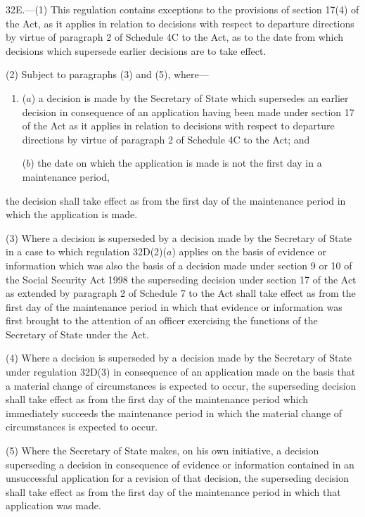 \documentclass[12pt,a4paper]{article}
\begin{document}
32E.—(1) This regulation contains exceptions to the provisions of section 17(4) of the Act, as it applies in relation to decisions with respect to departure directions by virtue of paragraph 2 of Schedule 4C to the Act, as to the date from which decisions which supersede earlier decisions are to take effect.

(2) Subject to paragraphs (3) and (5), where---
\begin{enumerate}\item[]
($a$) a decision is made by the Secretary of State which supersedes an earlier decision in consequence of an application having been made under section 17 of the Act as it applies in relation to decisions with respect to departure directions by virtue of paragraph 2 of Schedule 4C to the Act; and

($b$) the date on which the application is made is not the first day in a maintenance period, 
\end{enumerate}
the decision shall take effect as from the first day of the maintenance period in which the application is made.

(3) Where a decision is superseded by a decision made by the Secretary of State in a case to which regulation 32D(2)($a$) applies on the basis of evidence or information which was also the basis of a decision made under section 9 or 10 of the Social Security Act 1998 the superseding decision under section 17 of the Act as extended by paragraph 2 of Schedule 7 to the Act shall take effect as from the first day of the maintenance period in which that evidence or information was first brought to the attention of an officer exercising the functions of the Secretary of State under the Act.

(4) Where a decision is superseded by a decision made by the Secretary of State under regulation 32D(3) in consequence of an application made on the basis that a material change of circumstances is expected to occur, the superseding decision shall take effect as from the first day of the maintenance period which immediately succeeds the maintenance period in which the material change of circumstances is expected to occur.

(5) Where the Secretary of State makes, on his own initiative, a decision superseding a decision in consequence of evidence or information contained in an unsuccessful application for a revision of that decision, the superseding decision shall take effect as from the first day of the maintenance period in which that application was made.
\end{document}
